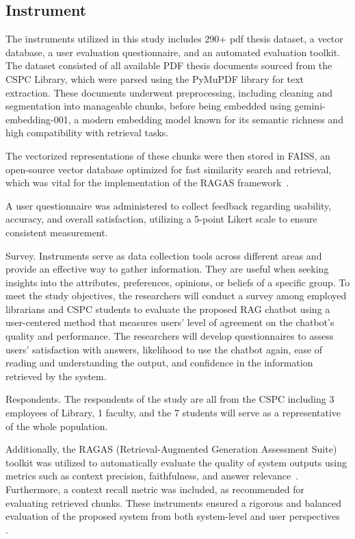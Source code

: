 \begin{refsection}
\subsection{Instrument}

The instruments utilized in this study includes 290+ pdf thesis dataset, a vector database, a user evaluation questionnaire, and an automated evaluation toolkit. The dataset consisted of all available PDF thesis documents sourced from the CSPC Library, which were parsed using the PyMuPDF library for text extraction. These documents underwent preprocessing, including cleaning and segmentation into manageable chunks, before being embedded using gemini-embedding-001, a modern embedding model known for its semantic richness and high compatibility with retrieval tasks.

The vectorized representations of these chunks were then stored in FAISS, an open-source vector database optimized for fast similarity search and retrieval, which was vital for the implementation of the RAGAS framework~\cite{trychroma2023chroma}.

A user questionnaire was administered to collect feedback regarding usability, accuracy, and overall satisfaction, utilizing a 5-point Likert scale to ensure consistent measurement.

Survey. Instruments serve as data collection tools across different areas and provide an effective way to gather information. They are useful when seeking insights into the attributes, preferences, opinions, or beliefs of a specific group. To meet the study objectives, the researchers will conduct a survey among employed librarians and CSPC students to evaluate the proposed RAG chatbot using a user-centered method that measures users’ level of agreement on the chatbot’s quality and performance. The researchers will develop questionnaires to assess users’ satisfaction with answers, likelihood to use the chatbot again, ease of reading and understanding the output, and confidence in the information retrieved by the system.

Respondents. The respondents of the study are all from the CSPC including 3 employees of Library, 1 faculty, and the 7 students will serve as a representative of the whole population.

Additionally, the RAGAS (Retrieval-Augmented Generation Assessment Suite) toolkit was utilized to automatically evaluate the quality of system outputs using metrics such as context precision, faithfulness, and answer relevance~\cite{shinn2023ragas}. Furthermore, a context recall metric was included, as recommended for evaluating retrieved chunks. These instruments ensured a rigorous and balanced evaluation of the proposed system from both system-level and user perspectives~ \cite{lin2021bert}.


\end{refsection}
